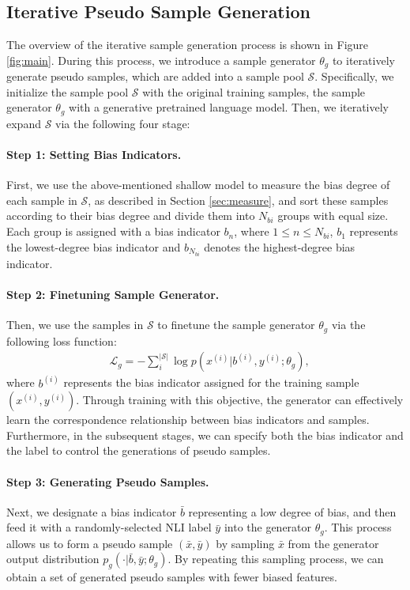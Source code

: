 \documentclass[11pt]{article}
\begin{document}
\subsection{Iterative Pseudo Sample Generation}
\label{sec:iter}
The overview of the iterative sample generation process is shown in Figure \ref{fig:main}. 
During this process, we introduce a sample generator $\theta_g$ to iteratively generate pseudo samples, which are added into a sample pool $\mathcal{S}$. Specifically, we initialize the sample pool $\mathcal{S}$ with the original training samples, the sample generator $\theta_g$ with a generative pretrained language model. Then, we iteratively expand $\mathcal{S}$ via the following four stage:


\paragraph{\indent Step 1: Setting Bias Indicators.}
First, we use the above-mentioned shallow model to measure the bias degree of each sample in $\mathcal{S}$, as described in Section \ref{sec:measure}, and sort these samples according to their bias degree and divide them into $N_{bi}$ groups with equal size. Each group is assigned with a bias indicator $b_n$, where $1$$\leq$$n$$\leq$$N_{bi}$, $b_1$ represents the lowest-degree bias indicator and $b_{N_{bi}}$ denotes the highest-degree bias indicator.
\paragraph{\indent Step 2: Finetuning Sample Generator.}
Then, we use the samples in $\mathcal{S}$ to finetune the sample generator $\theta_g$ via the following loss function:
\begin{align}
    &\mathcal L_g=-\sum_{i}^{|\mathcal S|} \log p(x^{(i)}|b^{(i)},y^{(i)}; \theta_g), 
\end{align}
where $b^{(i)}$ represents the bias indicator assigned for the training sample $(x^{(i)}, y^{(i)})$. Through training with this objective, the generator can effectively learn the correspondence relationship between bias indicators and samples. Furthermore, in the subsequent stages, we can specify both the bias indicator and the label to control the generations of pseudo samples.

\paragraph{\indent Step 3: Generating Pseudo Samples.}
Next, we designate a bias indicator $\bar b$ representing a low degree of bias, and then feed it with a randomly-selected NLI label $\bar y$ into the generator $\theta_g$. 
This process allows us to form a pseudo sample $(\bar x, \bar y)$ by sampling $\bar x$ from the generator output distribution $p_g(\cdot | \bar b, \bar y; \theta_g)$.
By repeating this sampling process, we can obtain a set of generated pseudo samples with fewer biased features.
\end{document}
